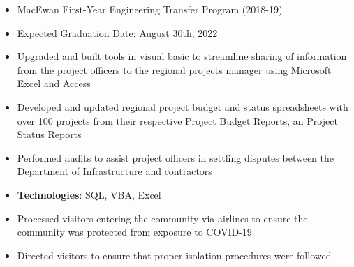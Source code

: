 \documentclass[10pt, letterpaper, ragged2e, withhyper]{altacv}
\begin{document}
\tagline{}

\makecvheader


\begin{paracol}{2}
        \begin{itemize}
            \item MacEwan First-Year Engineering Transfer Program (2018-19)
            \item Expected Graduation Date: August 30th, 2022
        \end{itemize}


            \begin{itemize}
                \item Upgraded and built tools in visual basic to streamline sharing of information from the project officers to the regional 
                projects manager using Microsoft Excel and Access 
                \item Developed and updated regional project budget and status spreadsheets with over 100 projects from their respective Project 
                Budget Reports, an Project Status Reports
                \item Performed audits to assist project officers in settling disputes between the Department of Infrastructure and contractors 
                \item \textbf{Technologies}: SQL, VBA, Excel 
            \end{itemize}

            \begin{itemize}
                \item Processed visitors entering the community via airlines to ensure the community was protected from exposure to COVID-19
                \item Directed visitors to ensure that proper isolation procedures were followed
            \end{itemize}


\end{paracol}
\end{document}
